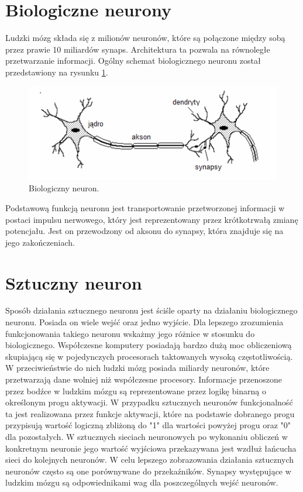 \section{Biologiczne neurony}

Ludzki mózg składa się z milionów neuronów, które są połączone między sobą przez prawie 10 miliardów synaps. Architektura ta pozwala na równoległe przetwarzanie informacji. Ogólny schemat biologicznego neuronu został przedstawiony na rysunku \ref{fig:bio_neuron}.

\begin{figure}[!htbp]
\centering
\includegraphics[width=1\linewidth]{./include/bio_neuron}
\caption{Biologiczny neuron.}
\label{fig:bio_neuron}
\end{figure}

Podstawową funkcją neuronu jest transportowanie przetworzonej informacji w postaci impulsu nerwowego, który jest reprezentowany przez krótkotrwałą zmianę potencjału. Jest on przewodzony od aksonu do synapsy, która znajduje się na jego zakończeniach. 

\section{Sztuczny neuron}
Sposób działania sztucznego neuronu jest ściśle oparty na działaniu biologicznego neuronu. Posiada on wiele wejść oraz jedno wyjście. Dla lepszego zrozumienia funkcjonowania takiego neuronu wskażmy jego różnice w stosunku do biologicznego.
Współczesne komputery posiadają bardzo dużą moc obliczeniową skupiającą się w pojedynczych procesorach taktowanych wysoką częstotliwością. W przeciwieństwie do nich ludzki mózg posiada miliardy neuronów, które przetwarzają dane wolniej niż współczesne procesory. Informacje przenoszone przez bodźce w ludzkim mózgu są reprezentowane przez logikę binarną o określonym progu aktywacji. W przypadku sztucznych neuronów funkcjonalność ta jest realizowana przez funkcje aktywacji, które na podstawie dobranego progu przypisują wartość logiczną zbliżoną do "1" dla wartości powyżej progu oraz "0" dla pozostałych. W sztucznych sieciach neuronowych po wykonaniu obliczeń w konkretnym neuronie jego wartość wyjściowa przekazywana jest wzdłuż łańcucha sieci do kolejnych neuronów. 
W celu lepszego zobrazowania działania sztucznych neuronów często są one porównywane do przekaźników. Synapsy występujące w ludzkim mózgu są odpowiednikami wag dla poszczególnych wejść neuronów.

